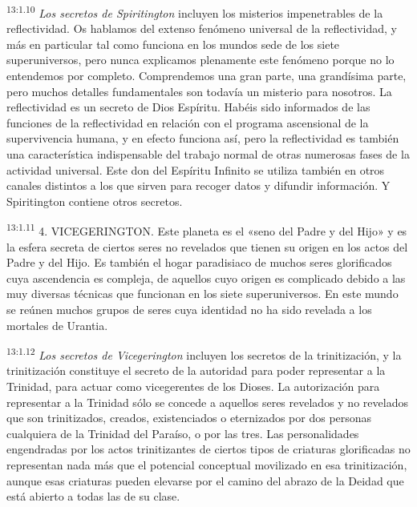 \par
\textsuperscript{13:1.10} \textit{Los secretos de Spiritington} incluyen los misterios impenetrables de la reflectividad. Os hablamos del extenso fenómeno universal de la reflectividad, y más en particular tal como funciona en los mundos sede de los siete superuniversos, pero nunca explicamos plenamente este fenómeno porque no lo entendemos por completo. Comprendemos una gran parte, una grandísima parte, pero muchos detalles fundamentales son todavía un misterio para nosotros. La reflectividad es un secreto de Dios Espíritu. Habéis sido informados de las funciones de la reflectividad en relación con el programa ascensional de la supervivencia humana, y en efecto funciona así, pero la reflectividad es también una característica indispensable del trabajo normal de otras numerosas fases de la actividad universal. Este don del Espíritu Infinito se utiliza también en otros canales distintos a los que sirven para recoger datos y difundir información. Y Spiritington contiene otros secretos.

\par
\textsuperscript{13:1.11} 4. VICEGERINGTON. Este planeta es el «seno del Padre y del Hijo» y es la esfera secreta de ciertos seres no revelados que tienen su origen en los actos del Padre y del Hijo. Es también el hogar paradisiaco de muchos seres glorificados cuya ascendencia es compleja, de aquellos cuyo origen es complicado debido a las muy diversas técnicas que funcionan en los siete superuniversos. En este mundo se reúnen muchos grupos de seres cuya identidad no ha sido revelada a los mortales de Urantia.

\par
\textsuperscript{13:1.12} \textit{Los secretos de Vicegerington} incluyen los secretos de la trinitización, y la trinitización constituye el secreto de la autoridad para poder representar a la Trinidad, para actuar como vicegerentes de los Dioses. La autorización para representar a la Trinidad sólo se concede a aquellos seres revelados y no revelados que son trinitizados, creados, existenciados o eternizados por dos personas cualquiera de la Trinidad del Paraíso, o por las tres. Las personalidades engendradas por los actos trinitizantes de ciertos tipos de criaturas glorificadas no representan nada más que el potencial conceptual movilizado en esa trinitización, aunque esas criaturas pueden elevarse por el camino del abrazo de la Deidad que está abierto a todas las de su clase.

